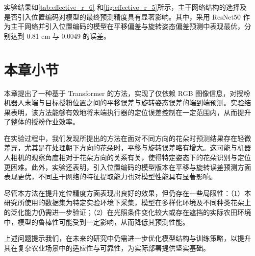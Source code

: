 实验结果如\cref{tab:effective_r_6} 和\cref{fig:effective_r_5}所示，主干网络结构的选择及是否引入位置编码对模型的最终预测精度具有显著影响。其中，采用 ResNet50 作为主干网络并引入位置编码的模型在平移偏差与旋转姿态偏差预测中表现最优，分别达到 0.81 cm 与 0.0049 的误差。



\section{本章小节}

本章提出了一种基于 Transformer 的方法，实现了仅依赖 RGB 图像信息，对授粉机器人末端与目标授粉位置之间的平移误差与旋转姿态误差的端到端预测。实验结果表明，该方法能够有效地将末端执行器的定位误差控制在一定范围内，从而提升了整体的授粉作业效率。

在实验过程中，我们发现所提出的方法在面对不同方向的花朵时预测结果存在轻微差异，尤其是在处理朝下方向的花朵时，平移与旋转误差略有增大。这可能与机器人相机的观察角度相对于花朵方向的关系有关，使得特定姿态下的花朵识别与定位更困难。此外，实验还表明，引入位置编码的模型版本在平移与旋转误差预测方面表现更优，不同主干网络的特征提取能力也对模型性能具有显著影响。

尽管本方法在提升定位精度方面表现出良好的效果，但仍存在一些局限性：（1）本研究所使用的数据集为特定实验环境下采集，模型在多样化环境及不同种类花朵上的泛化能力仍需进一步验证；（2）在光照条件变化较大或存在遮挡的实际农田环境中，模型的鲁棒性可能受到一定影响，从而降低其预测性能。

上述问题提示我们，在未来的研究中仍需进一步优化模型结构与训练策略，以提升其在复杂农业场景中的适应性与可靠性，为实际部署提供坚实基础。




